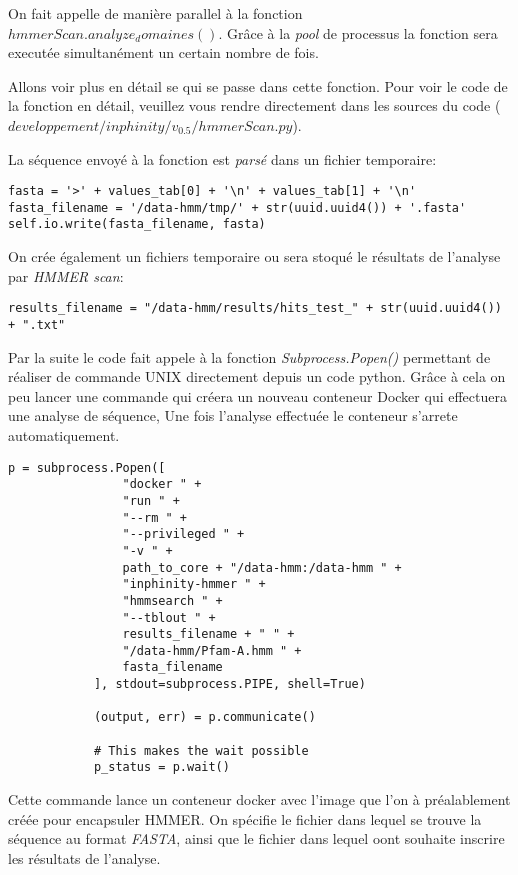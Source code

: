 On fait appelle de manière parallel à la fonction \emph{$hmmerScan.analyze_domaines()$}. Grâce à la \emph{pool} de processus la fonction sera executée simultanément un certain nombre de fois.

Allons voir plus en détail se qui se passe dans cette fonction. Pour voir le code de la fonction en détail, veuillez vous rendre directement dans les sources du code (\emph{$developpement/inphinity/v_0.5/hmmerScan.py$}).

La séquence envoyé à la fonction est \emph{parsé} dans un fichier temporaire:

\begin{lstlisting}[frame=single]
fasta = '>' + values_tab[0] + '\n' + values_tab[1] + '\n'
fasta_filename = '/data-hmm/tmp/' + str(uuid.uuid4()) + '.fasta'
self.io.write(fasta_filename, fasta)
\end{lstlisting} 

On crée également un fichiers temporaire ou sera stoqué le résultats de l'analyse par \emph{HMMER scan}:

\begin{lstlisting}[frame=single]
results_filename = "/data-hmm/results/hits_test_" + str(uuid.uuid4()) + ".txt"
\end{lstlisting} 

Par la suite le code fait appele à la fonction \emph{Subprocess.Popen()} permettant de réaliser de commande UNIX directement depuis un code python. Grâce à cela on peu lancer une commande qui créera un nouveau conteneur Docker qui effectuera une analyse de séquence, Une fois l'analyse effectuée le conteneur s'arrete automatiquement.


\begin{lstlisting}[frame=single]
p = subprocess.Popen([
                "docker " +
                "run " +
                "--rm " +
                "--privileged " +
                "-v " +
                path_to_core + "/data-hmm:/data-hmm " +
                "inphinity-hmmer " +
                "hmmsearch " +
                "--tblout " +
                results_filename + " " +
                "/data-hmm/Pfam-A.hmm " +
                fasta_filename
            ], stdout=subprocess.PIPE, shell=True)

            (output, err) = p.communicate()

            # This makes the wait possible
            p_status = p.wait()
\end{lstlisting} 

Cette commande lance un conteneur docker avec l'image que l'on à préalablement créée pour encapsuler HMMER. On spécifie le fichier dans lequel se trouve la séquence au format \emph{FASTA}, ainsi que le fichier dans lequel oont souhaite inscrire les résultats de l'analyse.

